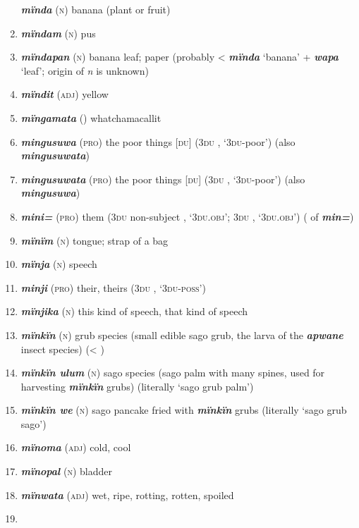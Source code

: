 \begin{enumerate}[noitemsep, label={}, align=left, widest=190, labelsep=1ex,leftmargin=*,itemindent=-10pt]
\textbf{\textit{mïnda}} (\textsc{n}) banana (plant or fruit) \item 
\textbf{\textit{mïndam}} (\textsc{n}) pus \item 
\textbf{\textit{mïndapan}} (\textsc{n}) banana leaf; paper (probably < \textbf{\textit{mïnda}} ‘banana’ + \textbf{\textit{wapa}} ‘leaf’; origin of \textit{n} is unknown) \item 
\textbf{\textit{mïndit}} (\textsc{adj}) yellow \item 
\textbf{\textit{mïngamata}} () whatchamacallit \item 
\textbf{\textit{mingusuwa}} (\textsc{pro}) the poor things [\textsc{du}] (3\textsc{du} , ‘\textsc{3du}-poor’) (also \textbf{\textit{mingusuwata}}) \item 
\textbf{\textit{mingusuwata}} (\textsc{pro}) the poor things [\textsc{du}] (3\textsc{du} , ‘\textsc{3du}-poor’) (also \textbf{\textit{mingusuwa}}) \item 
\textbf{\textit{mini=}} (\textsc{pro}) them (3\textsc{du} non-subject , ‘\textsc{3du.obj}’; 3\textsc{du} , ‘\textsc{3du.obj}’) ( of \textbf{\textit{min=}}) \item 
\textbf{\textit{mïnïm}} (\textsc{n}) tongue; strap of a bag \item 
\textbf{\textit{mïnja}} (\textsc{n}) speech \item 
\textbf{\textit{minji}} (\textsc{pro}) their, theirs (\textsc{3du} , ‘\textsc{3du-poss}’) \item 
\textbf{\textit{mïnjika}} (\textsc{n}) this kind of speech, that kind of speech \item 
\textbf{\textit{mïnkïn}} (\textsc{n}) grub species (small edible sago grub, the larva of the \textbf{\textit{apwane}} insect species) (< ) \item 
\textbf{\textit{mïnkïn ulum}} (\textsc{n}) sago species (sago palm with many spines, used for harvesting \textbf{\textit{mïnkïn}} grubs) (literally ‘sago grub palm’) \item 
\textbf{\textit{mïnkïn we}} (\textsc{n}) sago pancake fried with \textbf{\textit{mïnkïn}} grubs (literally ‘sago grub sago’) \item 
\textbf{\textit{mïnoma}} (\textsc{adj}) cold, cool \item 
\textbf{\textit{mïnopal}} (\textsc{n}) bladder \item 
\textbf{\textit{mïnwata}} (\textsc{adj}) wet, ripe, rotting, rotten, spoiled \item 

\end{enumerate}
